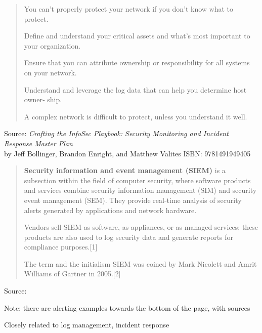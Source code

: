 \documentclass[Screen16to9,17pt]{foils}
\begin{document}


\begin{quote}
\begin{list2}
\item You can’t properly protect your network if you don’t know what to protect.
\item Define and understand your critical assets and what’s most important to your
  organization.
\item Ensure that you can attribute ownership or responsibility for all systems on your
  network.
\item Understand and leverage the log data that can help you determine host owner‐
  ship.
\item A complex network is difficult to protect, unless you understand it well.
\end{list2}
\end{quote}

Source:
 \emph{Crafting the InfoSec Playbook: Security Monitoring and Incident Response Master Plan}\\
 by Jeff Bollinger, Brandon Enright, and Matthew Valites ISBN: 9781491949405




\begin{quote}
{\bf Security information and event management (SIEM)} is a subsection within the field of computer security, where software products and services combine security information management (SIM) and security event management (SEM). They provide real-time analysis of security alerts generated by applications and network hardware.

  Vendors sell SIEM as software, as appliances, or as managed services; these products are also used to log security data and generate reports for compliance purposes.[1]

  The term and the initialism SIEM was coined by Mark Nicolett and Amrit Williams of Gartner in 2005.[2]
\end{quote}
Source: 

\begin{list2}
  \item Note: there are alerting examples towards the bottom of the page, with sources
  \item Closely related to log management, incident response
\end{list2}
\end{document}
